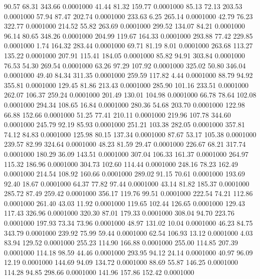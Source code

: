   90.57   68.31  343.66   0.0001000
  41.44   81.32  159.77   0.0001000
  85.13   72.13  203.53   0.0001000
  57.94   87.47  202.74   0.0001000
 233.63    6.25  265.14   0.0001000
  42.79   76.23  322.77   0.0001000
 214.52   55.82  263.69   0.0001000
 299.52  134.07   84.21   0.0001000
  96.14   80.65  348.26   0.0001000
 204.99  119.67  164.33   0.0001000
 293.88   77.42  229.85   0.0001000
   1.74  164.32  283.44   0.0001000
  69.71   81.19    8.01   0.0001000
 263.68  113.27  135.22   0.0001000
 207.91  115.41  184.05   0.0001000
  85.82   94.91  303.84   0.0001000
  76.53   54.30  269.54   0.0001000
  63.26   97.29  107.92   0.0001000
 325.02   50.80  346.04   0.0001000
  49.40   84.34  311.35   0.0001000
 259.59  117.82    4.44   0.0001000
  88.79   94.92  355.81   0.0001000
 129.45   81.86  213.43   0.0001000
 285.90  101.16  233.51   0.0001000
 262.07  106.37  259.24   0.0001000
 201.49  130.01  104.98   0.0001000
  66.78   78.64  102.08   0.0001000
 294.34  108.65   16.84   0.0001000
 280.36   54.68  203.70   0.0001000
 122.98   66.88  152.66   0.0001000
  51.25   77.41  210.11   0.0001000
 219.96  107.78  344.60   0.0001000
 245.79   92.19   85.93   0.0001000
 251.21  103.38  282.05   0.0001000
 357.81   74.12   84.83   0.0001000
 125.98   80.15  137.34   0.0001000
  87.67   53.17  105.38   0.0001000
 239.57   82.99  324.64   0.0001000
  48.23   81.59   29.47   0.0001000
 226.67   68.21  317.74   0.0001000
 180.29   36.09  143.51   0.0001000
 307.04  106.33  161.37   0.0001000
 264.97  115.32  186.96   0.0001000
 304.73  102.60  114.44   0.0001000
 248.16   78.23  162.49   0.0001000
 214.54  108.92  160.66   0.0001000
 289.02   91.15   70.61   0.0001000
 193.69   92.40   18.67   0.0001000
  64.37   77.82   97.44   0.0001000
  43.14   81.82  185.37   0.0001000
 285.72   87.49  259.42   0.0001000
 356.17  119.76   99.51   0.0001000
 222.54   74.21  112.86   0.0001000
 261.40   43.03   11.92   0.0001000
 119.65  102.44  126.65   0.0001000
 129.43  117.43  326.96   0.0001000
 320.30   87.01  179.33   0.0001000
 308.04   94.70  223.76   0.0001000
 197.93   73.34   73.96   0.0001000
  48.97  131.02   10.04   0.0001000
  46.23   84.75  343.79   0.0001000
 239.92   75.99   59.44   0.0001000
  62.54  106.93   13.12   0.0001000
   4.03   83.94  129.52   0.0001000
 255.23  114.90  166.88   0.0001000
 255.00  114.85  207.39   0.0001000
 114.18   98.59   44.46   0.0001000
 293.95   94.12   24.14   0.0001000
  40.97   96.09   12.19   0.0001000
 144.69   94.09  134.72   0.0001000
  88.69   55.87  146.25   0.0001000
 114.28   94.85  298.66   0.0001000
 141.96  157.86  152.42   0.0001000
